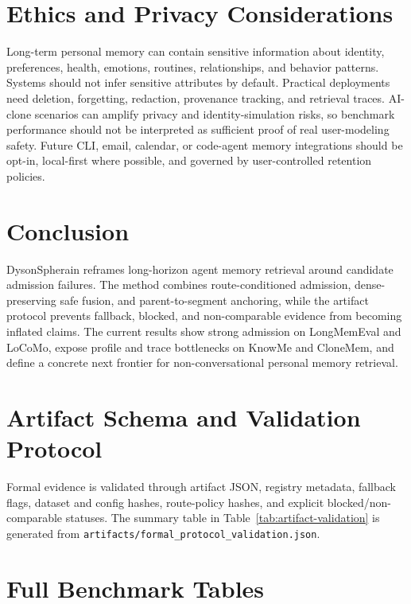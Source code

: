 \documentclass[10pt]{article}
\newcommand{\system}{DysonSpherain}
\newcommand{\artifact}[1]{\texttt{\small #1}}
\begin{document}
\section{Ethics and Privacy Considerations}

Long-term personal memory can contain sensitive information about identity,
preferences, health, emotions, routines, relationships, and behavior patterns.
Systems should not infer sensitive attributes by default. Practical deployments
need deletion, forgetting, redaction, provenance tracking, and retrieval traces.
AI-clone scenarios can amplify privacy and identity-simulation risks, so
benchmark performance should not be interpreted as sufficient proof of real
user-modeling safety. Future CLI, email, calendar, or code-agent memory
integrations should be opt-in, local-first where possible, and governed by
user-controlled retention policies.

\section{Conclusion}

\system{} reframes long-horizon agent memory retrieval around candidate
admission failures. The method combines route-conditioned admission,
dense-preserving safe fusion, and parent-to-segment anchoring, while the
artifact protocol prevents fallback, blocked, and non-comparable evidence from
becoming inflated claims. The current results show strong admission on
LongMemEval and LoCoMo, expose profile and trace bottlenecks on KnowMe and
CloneMem, and define a concrete next frontier for non-conversational personal
memory retrieval.

\appendix

\section{Artifact Schema and Validation Protocol}

Formal evidence is validated through artifact JSON, registry metadata,
fallback flags, dataset and config hashes, route-policy hashes, and explicit
blocked/non-comparable statuses. The summary table in
Table~\ref{tab:artifact-validation} is generated from
\artifact{artifacts/formal\_protocol\_validation.json}.

\section{Full Benchmark Tables}
\end{document}
